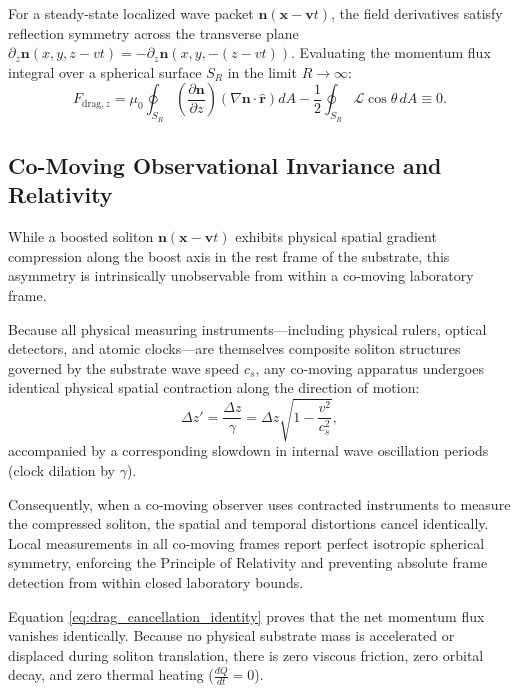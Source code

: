 \documentclass[11pt,a4paper]{article}
\begin{document}
	For a steady-state localized wave packet $\mathbf{n}(\mathbf{x} - \mathbf{v}t)$, the field derivatives satisfy reflection symmetry across the transverse plane $\partial_z \mathbf{n}(x, y, z - vt) = -\partial_z \mathbf{n}(x, y, -(z - vt))$. Evaluating the momentum flux integral over a spherical surface $S_R$ in the limit $R \to \infty$:
	\begin{equation}
		F_{\text{drag}, z} = \mu_0 \oint_{S_R} \left( \frac{\partial \mathbf{n}}{\partial z} \right) \left( \nabla \mathbf{n} \cdot \hat{\mathbf{r}} \right) d A - \frac{1}{2} \oint_{S_R} \mathcal{L} \cos\theta \, dA \equiv 0.
		\label{eq:drag_cancellation_identity}
	\end{equation}
	
	\subsection{Co-Moving Observational Invariance and Relativity}
	\label{app:co_moving_invariance}
	
	While a boosted soliton $\mathbf{n}(\mathbf{x} - \mathbf{v}t)$ exhibits physical spatial gradient compression along the boost axis in the rest frame of the substrate, this asymmetry is intrinsically unobservable from within a co-moving laboratory frame. 
	
	Because all physical measuring instruments—including physical rulers, optical detectors, and atomic clocks—are themselves composite soliton structures governed by the substrate wave speed $c_s$, any co-moving apparatus undergoes identical physical spatial contraction along the direction of motion:
	\begin{equation}
		\Delta z' = \frac{\Delta z}{\gamma} = \Delta z \sqrt{1 - \frac{v^2}{c_s^2}},
		\label{eq:co_moving_ruler_contraction}
	\end{equation}
	accompanied by a corresponding slowdown in internal wave oscillation periods (clock dilation by $\gamma$). 
	
	Consequently, when a co-moving observer uses contracted instruments to measure the compressed soliton, the spatial and temporal distortions cancel identically. Local measurements in all co-moving frames report perfect isotropic spherical symmetry, enforcing the Principle of Relativity and preventing absolute frame detection from within closed laboratory bounds.
	
	Equation \eqref{eq:drag_cancellation_identity} proves that the net momentum flux vanishes identically. Because no physical substrate mass is accelerated or displaced during soliton translation, there is zero viscous friction, zero orbital decay, and zero thermal heating ($\frac{dQ}{dt} = 0$).
	
\end{document}
